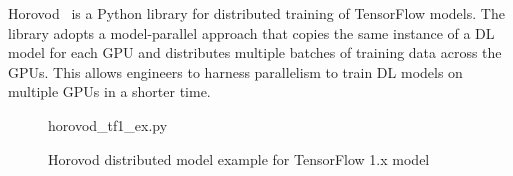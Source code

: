 Horovod~\cite{sergeev2018horovod} is a Python library for distributed training 
of TensorFlow models. 
The library adopts a model-parallel approach that copies the same instance of a
DL model for each GPU and distributes multiple batches of training data across
the GPUs.
This allows engineers to harness parallelism to train DL models on
multiple GPUs in a shorter time.

\begin{figure}[t!]
 
{horovod_tf1_ex.py}
  \caption{Horovod distributed model example for TensorFlow 1.x model}
\label{fig:back:hvd1} 
\end{figure}

